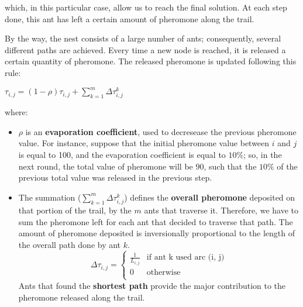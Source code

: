 \begin{example}
    which, in this particular case, allow us to reach the final solution. At each step done, this ant has left a certain amount of pheromone along the trail. \vspace{3.5pt}
    
    By the way, the nest consists of a large number of ants; consequently, several different paths are achieved. Every time a new node is reached, it is released 
    a certain quantity of pheromone. The released pheromone is updated following this rule: \vspace{3.5pt}
    \begin{center}
        $\tau_{i,j} = (1-\rho)\tau_{i,j} + \sum_{k=1}^{m} \Delta \tau_{i,j}^k$
    \end{center} \vspace{3.5pt}

    where:
    \begin{itemize}[nosep]
        \renewcommand{\labelitemi}{-}
        \item $\rho$ is an \textbf{evaporation coefficient}, used to decresease the previous pheromone value. For instance, suppose that the initial pheromone value between $i$ and $j$ is equal to 100, and the evaporation coefficient is equal to $10\%$; so, in the next round, the total value of pheromone will be $90$, such that the $10\%$ of the previous total value was released in the previous step. 
        \item The summation ($\sum_{k=1}^{m} \Delta \tau_{i,j}^k$) defines the \textbf{overall pheromone} deposited on that portion of the trail, by the $m$ ants that traverse it. Therefore, we have to sum the pheromone left for each ant that decided to traverse that path. The amount of pheromone deposited is inversionally proportional to the length of the overall path done by ant $k$.
        \begin{equation}
            \Delta \tau_{i, j} = 
            \begin{cases}
                \frac{1}{L_{i,j}} & \text{if ant k used arc (i, j)} \\
                0 & \text{otherwise} \\
            \end{cases}
        \end{equation}
        Ants that found the \textbf{shortest path} provide the major contribution to the pheromone released along the trail.
    \end{itemize}
\end{example}